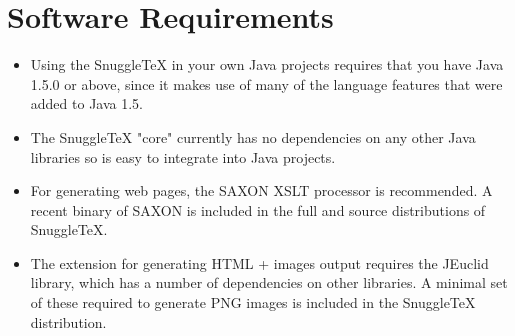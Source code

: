 
\section*{Software Requirements}

\begin{itemize}

  \item Using the SnuggleTeX in your own Java projects requires that you have
        Java 1.5.0 or above, since it makes use of many of the language
        features that were added to Java 1.5.

  \item The SnuggleTeX "core" currently has no dependencies on any other Java
        libraries so is easy to integrate into Java projects.

  \item For generating web pages, the SAXON XSLT processor is recommended. A
        recent binary of SAXON is included in the full and source distributions
        of SnuggleTeX.

  \item The extension for generating HTML + images output requires the
        JEuclid library, which has a number of dependencies on other
        libraries. A minimal set of these required to generate PNG images
        is included in the SnuggleTeX distribution.

\end{itemize}
